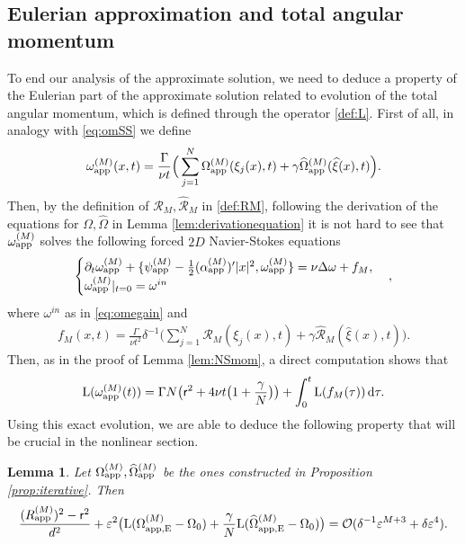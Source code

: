 \documentclass[11pt,reqno,a4paper]{amsart}
\def\dd{{\rm d}}
\def\eps{\varepsilon}
\def\de{{\partial}}
\newcommand{\cO}{\mathcal{O}}
\newcommand{\cR}{\mathcal{R}}
\newcommand{\1}{\mathbbm{1}}
\newtheorem{lemma}[proposition]{Lemma}
\theoremstyle{definition}
\theoremstyle{definition}
\numberwithin{equation}{section}
\begin{document}
\subsection{Eulerian approximation and total angular momentum}\label{sec:angmom}
To end our analysis of the approximate solution, we need to deduce a property of the Eulerian part of the approximate solution related to evolution of the {total angular momentum}, which is defined through the operator \cref{def:L}.
First of all, in analogy with \cref{eq:omSS} we define 
\begin{align}
\label{def:omappM}
\omega_{\rm app}^{(M)}(x,t)=\frac{\Gamma}{\nu t}\Big(\sum_{j=1}^N\Omega_{\rm app}^{(M)}(\xi_j(x),t)+\gamma\widehat{\Omega}_{\rm app}^{(M)}(\widehat{\xi}(x),t)\Big).
\end{align}
Then, by the definition of $\cR_{M},\widehat{\cR}_M$ in \eqref{def:RM}, following the derivation of the equations for $\Omega,\widehat{\Omega}$ in Lemma \ref{lem:derivationequation} it is not hard to see that $\omega_{\rm app}^{(M)}$ solves the following forced $2D$ Navier-Stokes equations
\begin{align}
\label{eq:NSappx}
    \begin{cases}
        \de_t\omega_{\rm app}^{(M)}+\{\psi_{\rm app}^{(M)}-\frac12(\alpha_{\rm app}^{(M)})'|x|^2,\omega_{\rm app}^{(M)}\}=\nu \Delta\omega+f_M,\\
    \omega_{\rm app}^{(M)}|_{t=0}=\omega^{in}
    \end{cases},
\end{align}
where $\omega^{in}$ as in \cref{eq:omegain} and
\begin{align}\label{def:fM}
    f_M(x,t)=\frac{\Gamma}{\nu t^2}\delta^{-1}\Big(\sum_{j=1}^N\cR_M(\xi_j(x),t)+\gamma\widehat{\cR}_M(\widehat{\xi}(x),t)\Big).
\end{align}
Then, as in the proof of Lemma \ref{lem:NSmom}, a direct computation shows that 
\begin{align}
\label{eq:angmomf}\mathrm{L}(\omega_{\rm app}^{(M)}(t))
=\Gamma N\big(\mathsf{r}^2+4\nu t \big(1+\frac{\gamma}{N}\big)\big)+\int_0^t \mathrm{L}(f_M(\tau))\, \dd \tau.
\end{align}
Using this exact evolution, we are able to deduce the following property that will be crucial in the nonlinear section.
\begin{lemma}
\label{lem:keyLEuler}
    Let $\Omega_{\rm app}^{(M)},\widehat{\Omega}_{\rm app}^{(M)}$ be the ones constructed in Proposition \ref{prop:iterative}. Then
    \begin{align}
    \label{eq:keyEuler}
      \frac{(R_{\rm app}^{(M)})^2-\mathsf{r}^2}{d^2}+\eps^2 \big(\mathrm{L}(\Omega_{\rm app,E}^{(M)}-\Omega_0)+\frac{\gamma}{N}\mathrm{L}(\widehat{\Omega}_{\rm app,E}^{(M)}-\Omega_0)\big)=\cO(\delta^{-1}\eps^{M+3}+\delta \eps^4).
    \end{align}
\end{lemma}
\end{document}
